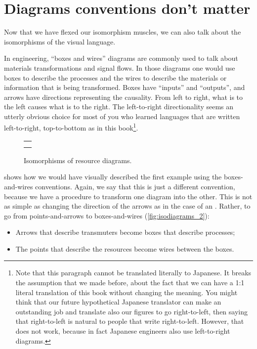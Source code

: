 {    \begin{figure}[h!]
        \centering
        \caption{}
        \label{fig:inverted_2}
    \end{figure}

    \section[Diagram conventions]{Diagrams conventions don't matter}

    Now that we have flexed our isomorphism muscles, we can also talk about the isomorphisms of the visual language.

    In engineering, ``boxes and wires'' diagrams are commonly used to talk about materials transformations and signal flows.
    In those diagrams one would use boxes to describe the processes and the wires to describe the materials or information that is being transformed.
    Boxes have ``inputs'' and ``outputs'', and arrows have directions representing the causality.
    From left to right, what is to the left causes what is to the right.
    The left-to-right directionality seems an utterly obvious choice for most of you who learned languages that are written left-to-right, top-to-bottom as in this book\footnote{
        Note that this paragraph cannot be translated literally to Japanese.
        It breaks the assumption that we made before, about the fact that we can have a 1:1 literal translation of this book without changing the meaning.
        You might think that our future hypothetical Japanese translator can make an outstanding job and translate also our figures to go right-to-left, then saying that right-to-left is natural to people that write right-to-left.
        However, that does not work, because in fact Japanese engineers also use left-to-right diagrams.
    }.

    \begin{figure}[h!]
        \centering
        \begin{tabular}{c}
            {20_iso_diags_1} \\
            {20_iso_diags_2}
        \end{tabular}
        \caption{Isomorphisms of resource diagrams.  }
        \label{fig:isodiagrams}
    \end{figure}

     shows how we would have visually described the first example using the boxes-and-wires conventions.
    Again, we say that this is just a different convention, because we have a procedure to transform one diagram into the other.
    This is not as simple as changing the direction of the arrows as in the case of an .
    Rather, to go from points-and-arrows to boxes-and-wires (\cref{fig:isodiagrams_2}):
    \begin{itemize}
        \item Arrows that describe transmuters become boxes that describe processes;
        \item The points that describe the resources become wires between the boxes.
    \end{itemize}

}
